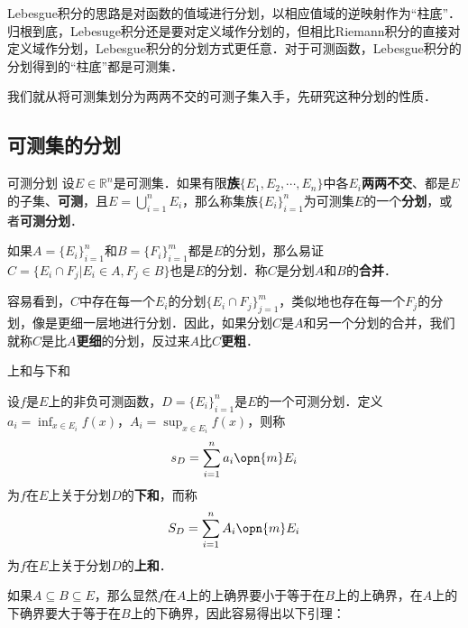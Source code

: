 

Lebesgue积分的思路是对函数的值域进行分划，以相应值域的逆映射作为“柱底”．归根到底，Lebesuge积分还是要对定义域作分划的，但相比Riemann积分的直接对定义域作分划，Lebesgue积分的分划方式更任意．对于可测函数，Lebesgue积分的分划得到的“柱底”都是可测集．

我们就从将可测集划分为两两不交的可测子集入手，先研究这种分划的性质．

\subsection{可测集的分划}



\begin{definition}{可测分划}
设$E\in\mathbb{R}^n$是可测集．如果有限\textbf{族}$\{E_1, E_2, \cdots, E_n\}$中各$E_i$\textbf{两两不交}、都是$E$的子集、\textbf{可测}，且$E=\bigcup^n_{i=1}E_i$，那么称集族$\{E_i\}_{i=1}^n$为可测集$E$的一个\textbf{分划}，或者\textbf{可测分划}．
\end{definition}

如果$A=\{E_i\}_{i=1}^n$和$B=\{F_i\}_{i=1}^m$都是$E$的分划，那么易证$C=\{E_i\cap F_j|E_i\in A, F_j\in B\}$也是$E$的分划．称$C$是分划$A$和$B$的\textbf{合并}．

容易看到，$C$中存在每一个$E_i$的分划$\{E_i\cap F_j\}_{j=1}^m$，类似地也存在每一个$F_j$的分划，像是更细一层地进行分划．因此，如果分划$C$是$A$和另一个分划的合并，我们就称$C$是比$A$\textbf{更细}的分划，反过来$A$比$C$\textbf{更粗}．

\begin{definition}{上和与下和}

设$f$是$E$上的非负可测函数，$D=\{E_i\}_{i=1}^n$是$E$的一个可测分划．定义$a_i=\inf_{x\in E_i}f(x)$，$A_i=\sup_{x\in E_i}f(x)$，则称
\begin{equation}
s_D=\sum_{i=1}^n a_i \opn{m}E_i
\end{equation}
为$f$在$E$上关于分划$D$的\textbf{下和}，而称
\begin{equation}
S_D=\sum_{i=1}^n A_i \opn{m}E_i
\end{equation}
为$f$在$E$上关于分划$D$的\textbf{上和}．

\end{definition}

如果$A\subseteq B\subseteq E$，那么显然$f$在$A$上的上确界要小于等于在$B$上的上确界，在$A$上的下确界要大于等于在$B$上的下确界，因此容易得出以下引理：

